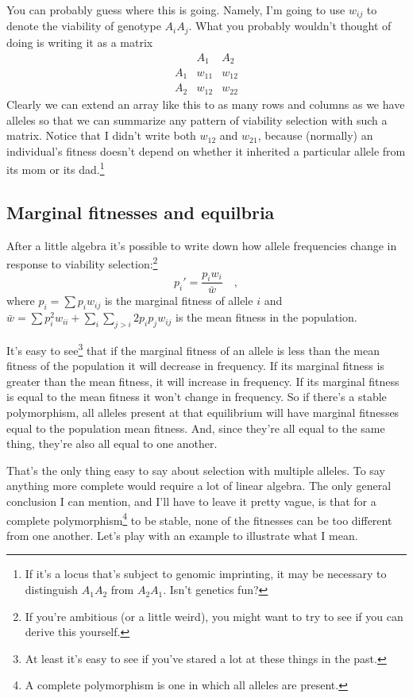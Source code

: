 \documentclass[12pt]{article}
\begin{document}
\noindent You can probably guess where this is going. Namely, I'm
going to use $w_{ij}$ to denote the viability of genotype
$A_iA_j$. What you probably wouldn't thought of doing is writing it as
a matrix
\[
\begin{array}{ccc}
    & A_1  & A_2 \\
A_1 & w_{11} & w_{12} \\
A_2 & w_{12} & w_{22} 
\end{array}
\]
Clearly we can extend an array like this to as many rows and columns
as we have alleles so that we can summarize any pattern of viability
selection with such a matrix. Notice that I didn't write both $w_{12}$
and $w_{21}$, because (normally) an individual's fitness doesn't
depend on whether it inherited a particular allele from its mom or its
dad.\footnote{If it's a locus that's subject to genomic imprinting, it
  may be necessary to distinguish $A_1A_2$ from $A_2A_1$. Isn't
  genetics fun?}

\subsection*{Marginal fitnesses and
  equilbria}

After a little algebra it's possible to write down how allele
frequencies change in response to viability selection:\footnote{If
  you're ambitious (or a little weird), you might want to try to see
  if you can derive this yourself.}
\[
p_i' = \frac{p_iw_i}{\bar w} \quad ,
\]
where $p_i = \sum p_i w_{ij}$ is the marginal fitness of allele $i$ and
$\bar w = \sum p_i^2 w_{ii} + \sum_i\sum_{j>i} 2p_ip_jw_{ij}$ is the
mean fitness in the population.

It's easy to see\footnote{At least it's easy to see if you've stared a
  lot at these things in the past.} that if the marginal fitness of an
allele is less than the mean fitness of the population it will
decrease in frequency. If its marginal fitness is greater than the
mean fitness, it will increase in frequency.  If its marginal fitness
is equal to the mean fitness it won't change in frequency. So if
there's a stable polymorphism, all alleles present at that equilibrium
will have marginal fitnesses equal to the population mean
fitness. And, since they're all equal to the same thing, they're also
all equal to one another.

That's the only thing easy to say about selection with multiple
alleles. To say anything more complete would require a lot of linear
algebra. The only general conclusion I can mention, and I'll have to
leave it pretty vague, is that for a complete polymorphism\footnote{A
complete polymorphism is one in which all alleles are present.} to be
stable, none of the fitnesses can be too different from one
another. Let's play with an example to illustrate what I mean.
\end{document}
